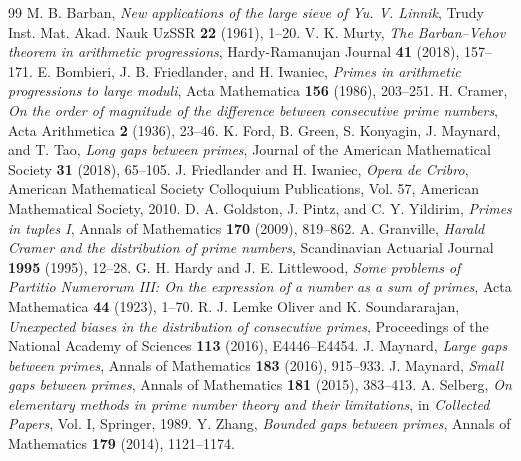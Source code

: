 \documentclass[10pt]{article}
\begin{document}
\begin{thebibliography}{99}
 M. B. Barban, \emph{New applications of the large sieve of Yu. V. Linnik}, Trudy Inst. Mat. Akad. Nauk UzSSR \textbf{22} (1961), 1--20.
 V. K. Murty, \emph{The Barban--Vehov theorem in arithmetic progressions}, Hardy-Ramanujan Journal \textbf{41} (2018), 157--171.
 E. Bombieri, J. B. Friedlander, and H. Iwaniec, \emph{Primes in arithmetic progressions to large moduli}, Acta Mathematica \textbf{156} (1986), 203--251.
 H. Cramer, \emph{On the order of magnitude of the difference between consecutive prime numbers}, Acta Arithmetica \textbf{2} (1936), 23--46.
 K. Ford, B. Green, S. Konyagin, J. Maynard, and T. Tao, \emph{Long gaps between primes}, Journal of the American Mathematical Society \textbf{31} (2018), 65--105.
 J. Friedlander and H. Iwaniec, \emph{Opera de Cribro}, American Mathematical Society Colloquium Publications, Vol. 57, American Mathematical Society, 2010.
 D. A. Goldston, J. Pintz, and C. Y. Yildirim, \emph{Primes in tuples I}, Annals of Mathematics \textbf{170} (2009), 819--862.
 A. Granville, \emph{Harald Cramer and the distribution of prime numbers}, Scandinavian Actuarial Journal \textbf{1995} (1995), 12--28.
 G. H. Hardy and J. E. Littlewood, \emph{Some problems of Partitio Numerorum III: On the expression of a number as a sum of primes}, Acta Mathematica \textbf{44} (1923), 1--70.
 R. J. Lemke Oliver and K. Soundararajan, \emph{Unexpected biases in the distribution of consecutive primes}, Proceedings of the National Academy of Sciences \textbf{113} (2016), E4446--E4454.
 J. Maynard, \emph{Large gaps between primes}, Annals of Mathematics \textbf{183} (2016), 915--933.
 J. Maynard, \emph{Small gaps between primes}, Annals of Mathematics \textbf{181} (2015), 383--413.
 A. Selberg, \emph{On elementary methods in prime number theory and their limitations}, in \emph{Collected Papers}, Vol. I, Springer, 1989.
 Y. Zhang, \emph{Bounded gaps between primes}, Annals of Mathematics \textbf{179} (2014), 1121--1174.
\end{thebibliography}
\end{document}
